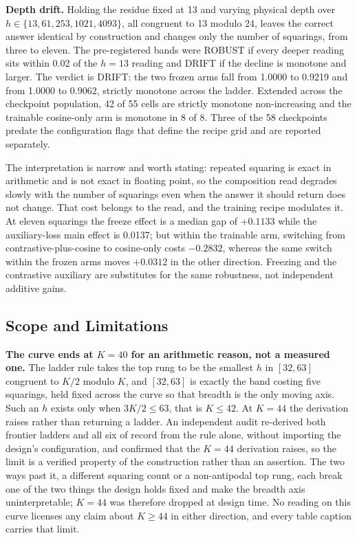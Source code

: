 \textbf{Depth drift.} Holding the residue fixed at 13 and varying physical
depth over $h \in \{13, 61, 253, 1021, 4093\}$, all congruent to 13
modulo 24, leaves the correct answer identical by construction and
changes only the number of squarings, from three to eleven. The
pre-registered bands were ROBUST if every deeper reading sits within
0.02 of the $h{=}13$ reading and DRIFT if the decline is monotone and
larger. The verdict is DRIFT: the two frozen arms fall from 1.0000 to
0.9219 and from 1.0000 to 0.9062, strictly monotone across the ladder.
Extended across the checkpoint population, 42 of 55 cells are strictly
monotone non-increasing and the trainable cosine-only arm is monotone in
8 of 8. Three of the 58 checkpoints predate the configuration flags that
define the recipe grid and are reported separately.

The interpretation is narrow and worth stating: repeated squaring is
exact in arithmetic and is not exact in floating point, so the
composition read degrades slowly with the number of squarings even when
the answer it should return does not change. That cost belongs to the
read, and the training recipe modulates it. At eleven squarings the
freeze effect is a median gap of $+0.1133$ while the auxiliary-loss main
effect is 0.0137; but within the trainable arm, switching from
contrastive-plus-cosine to cosine-only costs $-0.2832$, whereas the same
switch within the frozen arms moves $+0.0312$ in the other direction.
Freezing and the contrastive auxiliary are substitutes for the same
robustness, not independent additive gains.

\subsection{Scope and Limitations}

\textbf{The curve ends at $K{=}40$ for an arithmetic reason, not a measured
one.} The ladder rule takes the top rung to be the smallest $h$ in
$[32,63]$ congruent to $K/2$ modulo $K$, and $[32,63]$ is exactly the
band costing five squarings, held fixed across the curve so that breadth
is the only moving axis. Such an $h$ exists only when $3K/2 \leq 63$,
that is $K \leq 42$. At $K{=}44$ the derivation raises rather than
returning a ladder. An independent audit re-derived both frontier
ladders and all six of record from the rule alone, without importing the
design's configuration, and confirmed that the $K{=}44$ derivation
raises, so the limit is a verified property of the construction rather
than an assertion. The two ways past it, a different squaring count or a
non-antipodal top rung, each break one of the two things the design
holds fixed and make the breadth axis uninterpretable; $K{=}44$ was
therefore dropped at design time. No reading on this curve licenses any
claim about $K \geq 44$ in either direction, and every table caption
carries that limit.

